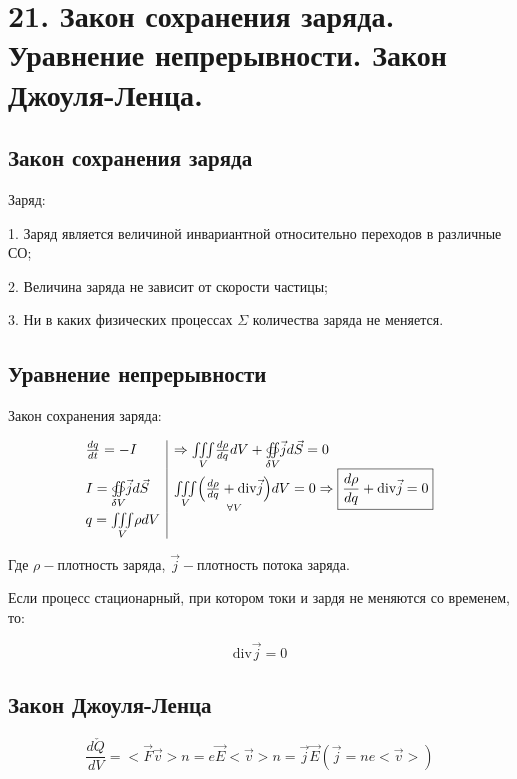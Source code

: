 


\newpage
\section*{21. Закон сохранения заряда. Уравнение непрерывности. Закон Джоуля-Ленца.}
 
\subsection*{Закон сохранения заряда}

Заряд:

1. Заряд является величиной инвариантной относительно переходов в различные СО;

2. Величина заряда не зависит от скорости частицы;

3. Ни в каких физических процессах $\Sigma$ количества заряда не меняется. 

\subsection*{Уравнение непрерывности}

Закон сохранения заряда:

\[\begin{array}{l|l}
    \frac{dq}{dt}=-I & \Rightarrow \underset{V}{\iiint} \frac{d\rho}{dq}dV +\underset{\delta V}{\oiint} \vec{j}d\vec{S}=0  \\
    I=\underset{\delta V}{\oiint} \vec{j}d\vec{S} & \underset{V}{\iiint}\underset{\forall V }{\left( \frac{d\rho}{dq}+\mm{div} \vec{j}  \right)}dV=0 \Rightarrow \boxed{\frac{d\rho}{dq}+\mm{div} \vec{j}=0 } \\
    q=\underset{V}{\iiint}\rho dV 
\end{array}\]

Где $\rho-$плотность заряда, $\vec{j}-$плотность потока заряда.

Если процесс стационарный, при котором токи и зардя не меняются со временем, то:

\[\mathrm{div}\vec{j} =0\]

\subsection*{Закон Джоуля-Ленца}

\[\frac{d\check{Q}}{dV} =<\vec{F}\vec{v}>n=e\vec{E}<\vec{v}>n=\vec{j}\vec{E}(\vec{j}=ne<\vec{v}>)\]

